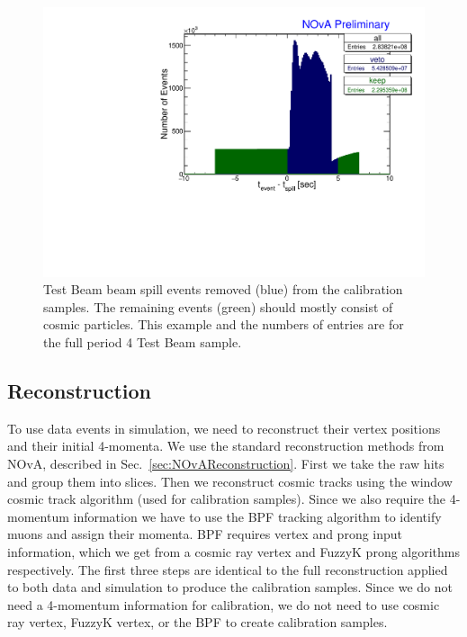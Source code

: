 \begin{figure}[hbtp]
\centering
\includegraphics[width=\textwidth]{Plots/TBCalibration/RemoveTBSpills.pdf}
\caption[Removing Test Beam beam spill]{Test Beam beam spill events removed (blue) from the calibration samples. The remaining events (green) should mostly consist of cosmic particles. This example and the numbers of entries are for the full period 4 Test Beam sample.}
\label{fig:RemoveTBSpills}
\end{figure}

\subsection*{Reconstruction}
To use data events in simulation, we need to reconstruct their vertex positions and their initial 4-momenta. We use the standard reconstruction methods from \gls{NOvA}, described in Sec.~\ref{sec:NOvAReconstruction}. First we take the raw hits and group them into slices. Then we reconstruct cosmic tracks using the window cosmic track algorithm (used for calibration samples). Since we also require the 4-momentum information we have to use the \gls{BPF} tracking algorithm to identify muons and assign their momenta. \gls{BPF} requires vertex and prong input information, which we get from a cosmic ray vertex and FuzzyK prong algorithms respectively. The first three steps are identical to the full reconstruction applied to both data and simulation to produce the calibration samples. Since we do not need a 4-momentum information for calibration, we do not need to use cosmic ray vertex, FuzzyK vertex, or the \gls{BPF} to create calibration samples.


